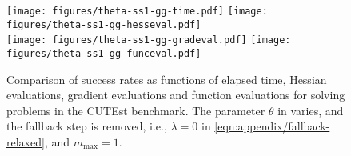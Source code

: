 \begin{table}[!tbp]
    \caption{
        Shifted geometric mean of the relevant metrics for different methods in the CUTEst benchmark.
        The fallback, second linesearch and linesearch failure rates are reported as mean values.
        The fallback parameter $\lambda$ in \eqref{eqn:appendix/fallback-relaxed} varies.
        }
    \label{tab:appendix-comparision-fallback}
\end{table}
\begin{table}[!tbp]
    \caption{
        Median of the relevant metrics for different methods in the CUTEst benchmark.
        The fallback parameter $\lambda$ in \eqref{eqn:appendix/fallback-relaxed} varies.
        }
    \label{tab:appendix-comparision-fallback-median}
\end{table}


\begin{figure}[!tbp]
    \centering
    \texttt{[image: figures/theta-ss1-gg-time.pdf]} \hfill
    \texttt{[image: figures/theta-ss1-gg-hesseval.pdf]} \\
    \vspace{1em}
    \texttt{[image: figures/theta-ss1-gg-gradeval.pdf]} \hfill
    \texttt{[image: figures/theta-ss1-gg-funceval.pdf]}
    \caption{
        Comparison of success rates as functions of elapsed time, Hessian evaluations, gradient evaluations and function evaluations for solving problems in the CUTEst benchmark.
        The parameter $\theta$ in  varies, and the fallback step is removed, i.e., $\lambda = 0$ in \eqref{eqn:appendix/fallback-relaxed}, and $m_{\mathrm{max}} = 1$.
        }
    \label{fig:appendix-comparision-theta}
\end{figure}



